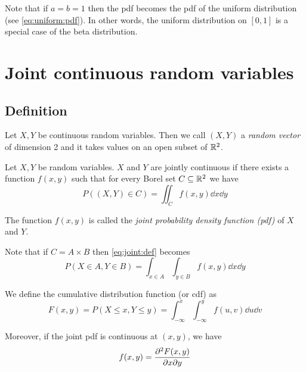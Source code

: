 \documentclass[14pt]{extarticle}
\begin{document}
Note that if $a = b = 1$ then the pdf becomes the pdf of the uniform distribution (see \autoref{eq:uniform:pdf}).
In other words, the uniform distribution on $[0, 1]$ is a special case of the beta distribution.

\section{Joint continuous random variables}

\subsection{Definition}

Let $X, Y$ be continuous random variables.
Then we call $(X, Y)$ a \emph{random vector} of dimension 2 and it takes values on an open subset of $\mathbb{R}^2$.

\begin{definition}
    Let $X, Y$ be random variables. $X$ and $Y$ are jointly continuous if there exists a function $f(x, y)$ such that for every Borel set $C \subseteq \mathbb{R}^2$ we have
    \begin{equation}
        P\left((X,Y) \in C\right) = \iint_C f(x, y) \dd{x} \dd{y} \label{eq:joint:def}
    \end{equation}

    The function $f(x,y)$ is called the \emph{joint probability density function (pdf)} of $X$ and $Y$.
\end{definition}

Note that if $C = A \times B$ then \autoref{eq:joint:def} becomes
\begin{equation}
    P(X \in A, Y \in B) = \int_{x \in A} \int_{y \in B} f(x, y) \dd{x} \dd{y}
\end{equation}

\begin{definition}
    We define the cumulative distribution function (or cdf) as
    \begin{equation}
        F(x, y) = P(X \leq x, Y \leq y) = \int_{-\infty}^x \int_{-\infty}^y f(u, v) \dd{u} \dd{v}
    \end{equation}
\end{definition}

Moreover, if the joint pdf is continuous at $(x, y)$, we have
\begin{equation}
    f(x, y) = \pdv[2]{F(x,y)}{x}{y}
\end{equation}
\end{document}
